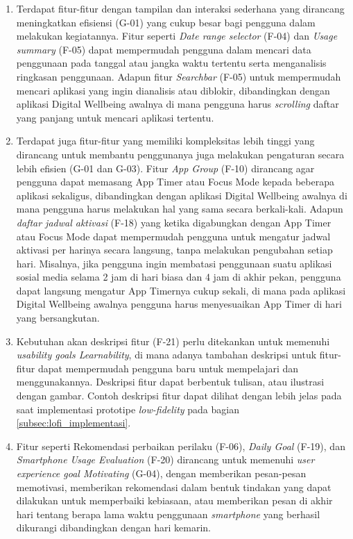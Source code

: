 \begin{enumerate}
  \item Terdapat fitur-fitur dengan tampilan dan interaksi sederhana yang dirancang meningkatkan efisiensi (G-01) yang cukup besar bagi pengguna dalam melakukan kegiatannya. Fitur seperti \textit{Date range selector} (F-04) dan \textit{Usage summary} (F-05) dapat mempermudah pengguna dalam mencari data penggunaan pada tanggal atau jangka waktu tertentu serta menganalisis ringkasan penggunaan. Adapun fitur \textit{Searchbar} (F-05) untuk mempermudah mencari aplikasi yang ingin dianalisis atau diblokir, dibandingkan dengan aplikasi Digital Wellbeing awalnya di mana pengguna harus \textit{scrolling} daftar yang panjang untuk mencari aplikasi tertentu.
  
  \item Terdapat juga fitur-fitur yang memiliki kompleksitas lebih tinggi yang dirancang untuk membantu penggunanya juga melakukan pengaturan secara lebih efisien (G-01 dan G-03). Fitur \textit{App Group} (F-10) dirancang agar pengguna dapat memasang App Timer atau Focus Mode kepada beberapa aplikasi sekaligus, dibandingkan dengan aplikasi Digital Wellbeing awalnya di mana pengguna harus melakukan hal yang sama secara berkali-kali. Adapun \textit{daftar jadwal aktivasi} (F-18) yang ketika digabungkan dengan App Timer atau Focus Mode dapat mempermudah pengguna untuk mengatur jadwal aktivasi per harinya secara langsung, tanpa melakukan pengubahan setiap hari. Misalnya, jika pengguna ingin membatasi penggunaan suatu aplikasi sosial media selama 2 jam di hari biasa dan 4 jam di akhir pekan, pengguna dapat langsung mengatur App Timernya cukup sekali, di mana pada aplikasi Digital Wellbeing awalnya pengguna harus menyesuaikan App Timer di hari yang bersangkutan.
  
  \item Kebutuhan akan deskripsi fitur (F-21) perlu ditekankan untuk memenuhi \textit{usability goals Learnability}, di mana adanya tambahan deskripsi untuk fitur-fitur dapat mempermudah pengguna baru untuk mempelajari dan menggunakannya. Deskripsi fitur dapat berbentuk tulisan, atau ilustrasi dengan gambar. Contoh deskripsi fitur dapat dilihat dengan lebih jelas pada saat implementasi prototipe \textit{low-fidelity} pada bagian \ref{subsec:lofi_implementasi}. 
  
  \item Fitur seperti Rekomendasi perbaikan perilaku (F-06), \textit{Daily Goal} (F-19), dan \textit{Smartphone Usage Evaluation} (F-20) dirancang untuk memenuhi \textit{user experience goal Motivating} (G-04), dengan memberikan pesan-pesan memotivasi, memberikan rekomendasi dalam bentuk tindakan yang dapat dilakukan untuk memperbaiki kebiasaan, atau memberikan pesan di akhir hari tentang berapa lama waktu penggunaan \textit{smartphone} yang berhasil dikurangi dibandingkan dengan hari kemarin.
\end{enumerate}




